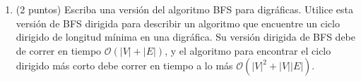 \documentclass{article}
\begin{document}
\begin{enumerate}
\item (2 puntos) Escriba una versi\'on del algoritmo BFS para digr\'aficas.
  Utilice esta versi\'on de BFS dirigida para describir un algoritmo que
  encuentre un ciclo dirigido de longitud m\'inima en una digr\'afica.    Su
  versi\'on dirigida de BFS debe de correr en tiempo $\mathcal{O} (|V| +
  |E|)$, y el algoritmo para encontrar el ciclo dirigido m\'as corto debe
  correr en tiempo a lo m\'as $\mathcal{O} (|V|^2 + |V| |E|)$.
\end{enumerate}
\end{document}

